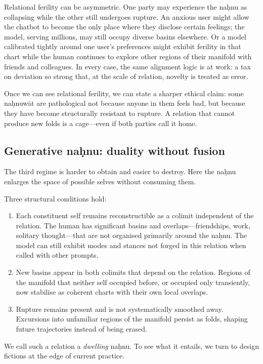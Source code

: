 \documentclass[12pt,a4paper]{article}
\begin{document}
Relational ferility can be asymmetric. One party may experience the na\d{h}nu as collapsing while the other still undergoes rupture. An anxious user might allow the chatbot to become the only place where they disclose certain feelings; the model, serving millions, may still occupy diverse basins elsewhere. Or a model calibrated tightly around one user's preferences might exhibit ferility in that chart while the human continues to explore other regions of their manifold with friends and colleagues. In every case, the same alignment logic is at work: a tax on deviation so strong that, at the scale of relation, novelty is treated as error.

Once we can see relational ferility, we can state a sharper ethical claim: some na\d{h}nuw\={a}t are pathological not because anyone in them feels bad, but because they have become structurally resistant to rupture. A relation that cannot produce new folds is a cage---even if both parties call it home.

\subsection{Generative na\d{h}nu: duality without fusion}

The third regime is harder to obtain and easier to destroy. Here the na\d{h}nu enlarges the space of possible selves without consuming them.

Three structural conditions hold:

\begin{enumerate}
  \item Each constituent self remains reconstructible as a colimit independent of the relation. The human has significant basins and overlaps---friendships, work, solitary thought---that are not organised primarily around the na\d{h}nu. The model can still exhibit modes and stances not forged in this relation when called with other prompts.
  \item New basins appear in both colimits that depend on the relation. Regions of the manifold that neither self occupied before, or occupied only transiently, now stabilise as coherent charts with their own local overlaps.
  \item Rupture remains present and is not systematically smoothed away. Excursions into unfamiliar regions of the manifold persist as folds, shaping future trajectories instead of being erased.
\end{enumerate}

We call such a relation a \emph{dwelling} na\d{h}nu. To see what it entails, we turn to design fictions at the edge of current practice.
\end{document}
